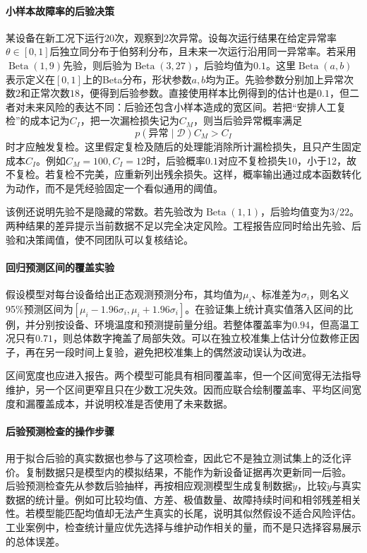 \paragraph{小样本故障率的后验决策}
某设备在新工况下运行$20$次，观察到$2$次异常。设每次运行结果在给定异常率$\theta\in[0,1]$后独立同分布于伯努利分布，且未来一次运行沿用同一异常率。若采用$\operatorname{Beta}(1,9)$先验，则后验为$\operatorname{Beta}(3,27)$，后验均值为$0.1$。这里$\operatorname{Beta}(a,b)$表示定义在$[0,1]$上的Beta分布，形状参数$a,b$均为正。先验参数分别加上异常次数$2$和正常次数$18$，便得到后验参数。直接使用样本比例得到的估计也是$0.1$，但二者对未来风险的表达不同：后验还包含小样本造成的宽区间。若把“安排人工复检”的成本记为$C_I$，把一次漏检损失记为$C_M$，则当后验异常概率满足
\begin{equation}
 p(\text{异常}\mid\mathcal D)C_M>C_I
\end{equation}
时才应触发复检。这里假定复检及随后的处理能消除所计漏检损失，且只产生固定成本$C_I$。例如$C_M=100,C_I=12$时，后验概率$0.1$对应不复检损失10，小于12，故不复检。若复检不完美，应重新列出残余损失。这样，概率输出通过成本函数转化为动作，而不是凭经验固定一个看似通用的阈值。

该例还说明先验不是隐藏的常数。若先验改为$\operatorname{Beta}(1,1)$，后验均值变为$3/22$。两种结果的差异提示当前数据不足以完全决定风险。工程报告应同时给出先验、后验和决策阈值，使不同团队可以复核结论。

\paragraph{回归预测区间的覆盖实验}
假设模型对每台设备给出正态观测预测分布，其均值为$\mu_i$、标准差为$\sigma_i$，则名义95\%预测区间为$[\mu_i-1.96\sigma_i,\mu_i+1.96\sigma_i]$。在验证集上统计真实值落入区间的比例，并分别按设备、环境温度和预测提前量分组。若整体覆盖率为$0.94$，但高温工况只有$0.71$，则总体数字掩盖了局部失效。可以在独立校准集上估计分位数修正因子，再在另一段时间上复验，避免把校准集上的偶然波动误认为改进。

区间宽度也应进入报告。两个模型可能具有相同覆盖率，但一个区间宽得无法指导维护，另一个区间更窄且只在少数工况失效。因而应联合绘制覆盖率、平均区间宽度和漏覆盖成本，并说明校准是否使用了未来数据。

\paragraph{后验预测检查的操作步骤}
用于拟合后验的真实数据也参与了这项检查，因此它不是独立测试集上的泛化评价。复制数据只是模型内的模拟结果，不能作为新设备证据再次更新同一后验。
后验预测检查先从参数后验抽样，再按相应观测模型生成复制数据$\tilde y$，比较$\tilde y$与真实数据的统计量。例如可比较均值、方差、极值数量、故障持续时间和相邻残差相关性。若模型能匹配均值却无法产生真实的长尾，说明其似然假设不适合风险评估。工业案例中，检查统计量应优先选择与维护动作相关的量，而不是只选择容易展示的总体误差。

